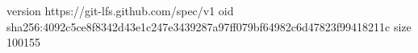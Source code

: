 version https://git-lfs.github.com/spec/v1
oid sha256:4092c5ce8f8342d43e1c247e3439287a97ff079bf64982c6d47823f99418211c
size 100155
